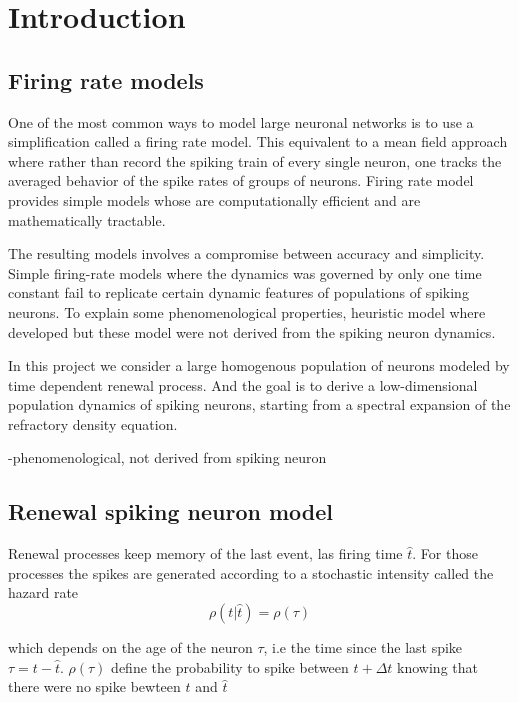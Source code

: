 \documentclass[a4paper,11pt,twoside]{article}
\numberwithin{equation}{section}
\begin{document}
\tableofcontents
\newpage

\section{Introduction}
\label{sec:intro}

\subsection{Firing rate models}
\label{subsec:riringrate}

One of the most common ways to model large neuronal networks is to use a simplification called a firing rate model.  This equivalent to a mean field approach where rather than record the spiking train of every single neuron, one tracks the averaged behavior of the spike rates of groups of neurons. Firing rate model provides simple models whose are computationally efficient and are mathematically tractable. 

The resulting models involves a compromise between accuracy and simplicity. Simple
firing-rate models where the dynamics was governed by only one time constant fail to replicate certain dynamic features of populations of spiking neurons. To explain some phenomenological properties, heuristic model where developed but these model were not derived from the spiking neuron dynamics. 

In this project we consider a large homogenous population of neurons modeled by time dependent renewal process. And the goal is to derive a low-dimensional population dynamics of spiking neurons, starting from a spectral expansion of the refractory density equation.

-phenomenological, not derived from spiking neuron \cite{DayAbb05}

\subsection{Renewal spiking neuron model}
\label{subsec:renew}

Renewal processes keep memory of the last event, las firing time $\hat{t}$. For those processes the spikes are generated according to a stochastic intensity called the hazard rate
\begin{equation}
\label{eq:rho1}
\rho(t|\hat{t})=\rho(\tau)
\end{equation}

which depends on the age of the neuron $\tau$, i.e the time since the last spike $\tau=t-\hat{t}$. $\rho(\tau)$ define the probability to spike between $t+\Delta t$ knowing that there were no spike bewteen $t$ and $\hat{t}$
\end{document}
